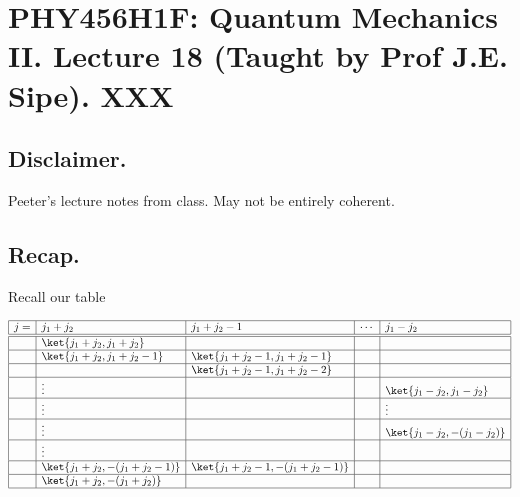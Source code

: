 
%

\chapter{PHY456H1F: Quantum Mechanics II.  Lecture 18 (Taught by Prof J.E. Sipe).  XXX}
\label{chap:qmTwoL18}
{}
\date{Nov 12, 2011}

\beginArtWithToc

\section{Disclaimer.}

Peeter's lecture notes from class.  May not be entirely coherent.

\section{Recap.}

Recall our table

\begin{equation}\label{eqn:qmTwoL18:n}
\begin{array}{| l | l | l | l | l |}
\hline
j = & j_1 + j_2				& j_1 + j_2 -1 				& \cdots 	& j_1 - j_2 \\
\hline
\hline
  &  \ket{j_1 + j_2, j_1 + j_2}	 	&					& 		& \\
\hline
  &  \ket{j_1 + j_2, j_1 + j_2 - 1}	&  \ket{j_1 + j_2 - 1, j_1 + j_2 - 1}	& 		& \\
\hline
  &                                     & \ket{j_1 + j_2 - 1, j_1 + j_2 - 2}	& 		& \\
\hline
  & \vdots 	 			&					& 		& \ket{j_1 - j_2, j_1 - j_2} \\
\hline
  & \vdots 	 			&					& 		& \vdots \\
\hline
  & \vdots 	 			&					& 		& \ket{j_1 - j_2, -(j_1 - j_2)} \\
\hline
  & \vdots 	 			&					& 		& \\
\hline
  &  \ket{j_1 + j_2, -(j_1 + j_2 - 1)}	& \ket{j_1 + j_2 -1, -(j_1 + j_2 - 1)}	& 		& \\
\hline
  &  \ket{j_1 + j_2, -(j_1 + j_2)}	&					& 		&  \\
\hline
\end{array}
\end{equation}

